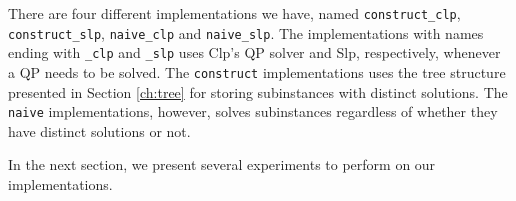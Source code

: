 There are four different implementations we have, named
\texttt{construct\_clp}, \texttt{construct\_slp}, \texttt{naive\_clp} and
\texttt{naive\_slp}. The implementations with names ending with
\texttt{\_clp} and \texttt{\_slp} uses Clp's QP solver and Slp, respectively,
whenever a QP needs to be solved.
The \texttt{construct} implementations uses the tree structure presented
in Section \ref{ch:tree} for storing subinstances with distinct solutions.
The \texttt{naive} implementations, however, solves subinstances regardless of
whether they have distinct solutions or not.

In the next section, we present several experiments to perform on our
implementations.
